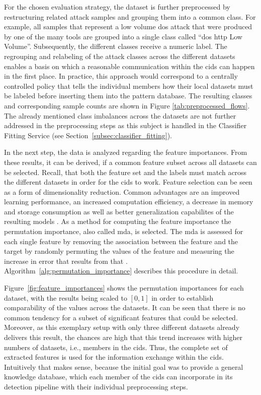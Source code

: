 \documentclass[../../main.tex]{subfiles}
\begin{document}
For the chosen evaluation strategy, the dataset is further preprocessed by restructuring related attack samples and grouping them into a common class. For example, all samples that represent a low volume \gls{dos} attack that were produced by one of the many tools are grouped into a single class called ``\gls{dos} \gls{http} Low Volume''. Subsequently, the different classes receive a numeric label. The regrouping and relabeling of the attack classes across the different datasets enables a basis on which a reasonable communication within the \gls{cids} can happen in the first place. In practice, this approach would correspond to a centrally controlled policy that tells the individual members how their local datasets must be labeled before inserting them into the pattern database. The resulting classes and corresponding sample counts are shown in Figure \ref{tab:preprocessed_flows}. The already mentioned class imbalances across the datasets are not further addressed in the preprocessing steps as this subject is handled in the Classifier Fitting Service (see Section~\ref{subsec:classifier_fitting}).

In the next step, the data is analyzed regarding the feature importances. From these results, it can be derived, if a common feature subset across all datasets can be selected. Recall, that both the feature set and the labels must match across the different datasets in order for the \gls{cids} to work. Feature selection can be seen as a form of dimensionality reduction. Common advantages are an improved learning performance, an increased computation efficiency, a decrease in memory and storage consumption as well as better generalization capabilites of the resulting models \cite{li2017feature}. As a method for computing the feature importance the permutation importance, also called \gls{mda}, is selected. The \gls{mda} is assessed for each single feature by removing the association between the feature and the target by randomly permuting the values of the feature and measuring the increase in error that results from that \cite[125]{rforests_2014}. Algorithm~\ref{alg:permutation_importance} describes this procedure in detail.

Figure~\ref{fig:feature_importances} shows the permutation importances for each dataset, with the results being scaled to $[0,1]$ in order to establish comparability of the values across the datasets. It can be seen that there is no common tendency for a subset of significant features that could be selected. Moreover, as this exemplary setup with only three different datasets already delivers this result, the chances are high that this trend increases with higher numbers of datasets, i.e., members in the \gls{cids}. Thus, the complete set of extracted features is used for the information exchange within the \gls{cids}. Intuitively that makes sense, because the initial goal was to provide a general knowledge database, which each member of the \gls{cids} can incorporate in its detection pipeline with their individual preprocessing steps.
\end{document}
